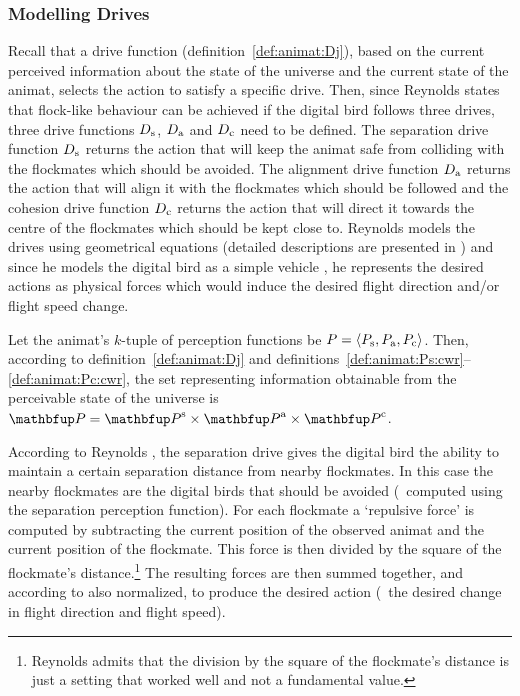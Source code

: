 \subsubsection{Modelling Drives}
Recall that a drive function (definition~\ref{def:animat:Dj}), based on the current perceived information about the state of the universe and the current state of the animat, selects the action to satisfy a specific drive. Then, since Reynolds states that flock-like behaviour can be achieved if the digital bird follows three drives, three drive functions $D_\textnormal{s}$, $D_\textnormal{a}$ and $D_\textnormal{c}$ need to be defined. The separation drive function $D_\textnormal{s}$ returns the action that will keep the animat safe from colliding with the flockmates which should be avoided. The alignment drive function $D_\textnormal{a}$ returns the action that will align it with the flockmates which should be followed and the cohesion drive function $D_\textnormal{c}$ returns the action that will direct it towards the centre of the flockmates which should be kept close to. Reynolds models the drives using geometrical equations (detailed descriptions are presented in \cite{reynolds:1999}) and since he models the digital bird as a simple vehicle \cite{reynolds:1987,reynolds:1999}, he represents the desired actions as physical forces which would induce the desired flight direction and/or flight speed change.  

Let the animat's $k$-tuple of perception functions be  $P=\langle P_\textnormal{s},P_\textnormal{a},P_\textnormal{c}\rangle$. Then, according to definition~\ref{def:animat:Dj} and definitions~\ref{def:animat:Ps:cwr}--\ref{def:animat:Pc:cwr}, the set representing information obtainable from the perceivable state of the universe is $\set{P}=\set{P}^\textnormal{s} \times \set{P}^\textnormal{a} \times \set{P}^\textnormal{c}$. 

According to Reynolds \cite{reynolds:1999}, the separation drive gives the digital bird the ability to maintain a certain separation distance from nearby flockmates. In this case the nearby flockmates are the digital birds that should be avoided (\ie\ computed using the separation perception function). For each flockmate a `repulsive force' is computed by subtracting the current position of the observed animat and the current position of the flockmate. This force is then divided by the square of the flockmate's distance.\footnote{Reynolds admits \cite{reynolds:1999} that the division by the square of the flockmate's distance is just a setting that worked well and not a fundamental value.} The resulting forces are then summed together, and according to  also normalized, to produce the desired action (\ie\ the desired change in flight direction and flight speed). 

